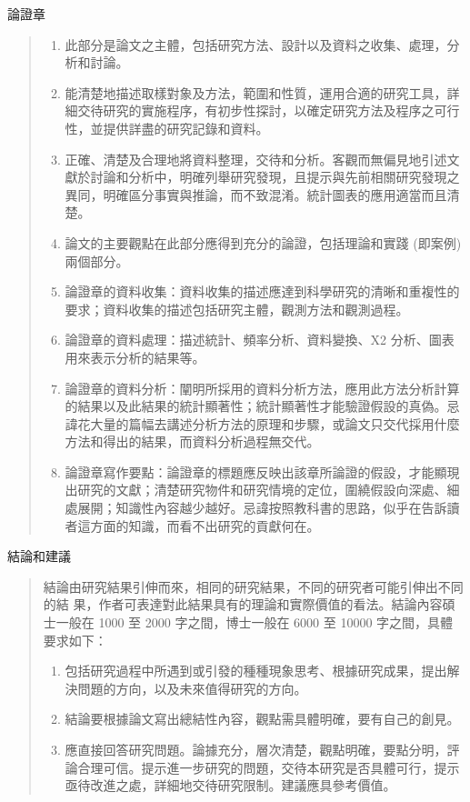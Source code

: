 \documentclass[
    writingLanguage=chinese, %
    addPageTitle=on,  %
    addDeclaration=on, %
    addMUSTlog=on, %
    addFigTOC=on, %
    addTabTOC=on, %
    refIndent=off, %
    printMod=off, %
]{must}
\begin{document}
\noindent\faHandORight 論證章
\begin{quote}
\begin{enumerate}
    \item 此部分是論文之主體，包括研究方法、設計以及資料之收集、處理，分析和討論。
    \item  能清楚地描述取樣對象及方法，範圍和性質，運用合適的研究工具，詳細交待研究的實施程序，有初步性探討，以確定研究方法及程序之可行性，並提供詳盡的研究記錄和資料。
    \item  正確、清楚及合理地將資料整理，交待和分析。客觀而無偏見地引述文獻於討論和分析中，明確列舉研究發現，且提示與先前相關研究發現之異同，明確區分事實與推論，而不致混淆。統計圖表的應用適當而且清楚。
    \item 論文的主要觀點在此部分應得到充分的論證，包括理論和實踐 (即案例)兩個部分。
    \item 論證章的資料收集：資料收集的描述應達到科學研究的清晰和重複性的要求；資料收集的描述包括研究主體，觀測方法和觀測過程。
    \item 論證章的資料處理：描述統計、頻率分析、資料變換、X2 分析、圖表用來表示分析的結果等。
    \item 論證章的資料分析：闡明所採用的資料分析方法，應用此方法分析計算的結果以及此結果的統計顯著性；統計顯著性才能驗證假設的真偽。忌諱花大量的篇幅去講述分析方法的原理和步驟，或論文只交代採用什麼方法和得出的結果，而資料分析過程無交代。
  \item 論證章寫作要點：論證章的標題應反映出該章所論證的假設，才能顯現出研究的文獻；清楚研究物件和研究情境的定位，圍繞假設向深處、細處展開；知識性內容越少越好。忌諱按照教科書的思路，似乎在告訴讀者這方面的知識，而看不出研究的貢獻何在。
\end{enumerate}

\end{quote}

\noindent\faHandORight 結論和建議
\begin{quote}
結論由研究結果引伸而來，相同的研究結果，不同的研究者可能引伸出不同的結
果，作者可表達對此結果具有的理論和實際價值的看法。結論內容碩士一般在
1000 至 2000 字之間，博士一般在 6000 至 10000 字之間，具體要求如下：

\begin{enumerate}
    \item 包括研究過程中所遇到或引發的種種現象思考、根據研究成果，提出解決問題的方向，以及未來值得研究的方向。
    \item 結論要根據論文寫出總結性內容，觀點需具體明確，要有自己的創見。
    \item 應直接回答研究問題。論據充分，層次清楚，觀點明確，要點分明，評論合理可信。提示進一步研究的問題，交待本研究是否具體可行，提示亟待改進之處，詳細地交待研究限制。建議應具參考價值。
\end{enumerate}
\end{quote}
\end{document}

